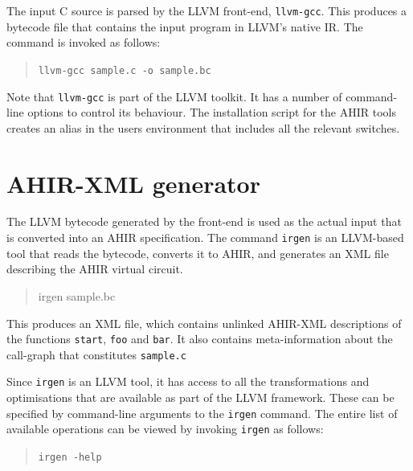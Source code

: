 \documentclass[12pt]{article}
\begin{document}
The input C source is parsed by the LLVM front-end, \texttt{llvm-gcc}. 
This produces a bytecode file that contains the input program in
LLVM's native IR. The command is invoked as follows:

\begin{quote}
\tt llvm-gcc sample.c -o sample.bc
\end{quote}

Note that \texttt{llvm-gcc} is part of the LLVM toolkit. It has a
number of command-line options to control its behaviour. The
installation script for the AHIR tools creates an alias in the users
environment that includes all the relevant switches.

\section{AHIR-XML generator}

The LLVM bytecode generated by the front-end is used as the actual
input that is converted into an AHIR specification. The command
\texttt{irgen} is an LLVM-based tool that reads the bytecode, converts
it to AHIR, and generates an XML file describing the AHIR virtual
circuit.

\begin{quote}
  irgen sample.bc
\end{quote}

This produces an XML file, which contains unlinked AHIR-XML
descriptions of the functions \texttt{start}, \texttt{foo} and
\texttt{bar}. It also contains meta-information about the call-graph
that constitutes \texttt{sample.c}

Since \texttt{irgen} is an LLVM tool, it has access to all the
transformations and optimisations that are available as part of the
LLVM framework. These can be specified by command-line arguments to
the \texttt{irgen} command. The entire list of available operations
can be viewed by invoking \texttt{irgen} as follows:

\begin{quote}
\tt  irgen -help
\end{quote}

\end{document}
